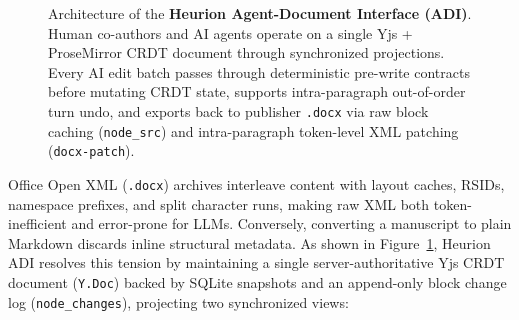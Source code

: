 \documentclass[11pt,a4paper]{article}
\begin{document}
\begin{figure}[!t]
{%
}
\caption{Architecture of the \textbf{Heurion Agent-Document Interface (ADI)}. Human co-authors and AI agents operate on a single Yjs + ProseMirror CRDT document through synchronized projections. Every AI edit batch passes through deterministic pre-write contracts before mutating CRDT state, supports intra-paragraph out-of-order turn undo, and exports back to publisher \texttt{.docx} via raw block caching (\texttt{node\_src}) and intra-paragraph token-level XML patching (\texttt{docx-patch}).}
\label{fig:adi_architecture}
\end{figure}

Office Open XML (\texttt{.docx}) archives interleave content with layout caches, RSIDs, namespace prefixes, and split character runs, making raw XML both token-inefficient and error-prone for LLMs. Conversely, converting a manuscript to plain Markdown discards inline structural metadata. As shown in Figure~\ref{fig:adi_architecture}, Heurion ADI resolves this tension by maintaining a single server-authoritative Yjs CRDT document (\texttt{Y.Doc}) \cite{nicolaescu2016yjs} backed by SQLite snapshots and an append-only block change log (\texttt{node\_changes}), projecting two synchronized views:
\end{document}
